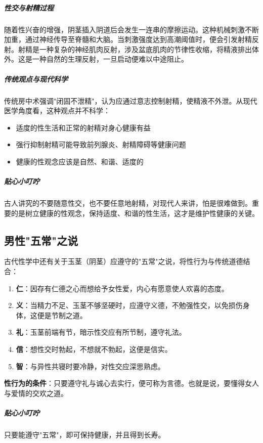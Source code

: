 \subparagraph{性交与射精过程}

随着性兴奋的增强，阴茎插入阴道后会发生一连串的摩擦运动。这种机械刺激不断加重，通过神经传导至脊髓和大脑。当刺激强度达到高潮阈值时，便会引发射精反射。射精是一种复杂的神经肌肉反射，涉及盆底肌肉的节律性收缩，将精液排出体外。这是一种自然的生理反射，一旦启动便难以中途阻止。

\subparagraph{传统观点与现代科学}

传统房中术强调"闭固不泄精"，认为应通过意志控制射精，使精液不外泄。从现代医学角度看，这种观点并不科学：
\begin{itemize}
    \item 适度的性生活和正常的射精对身心健康有益
    \item 强行抑制射精可能导致前列腺炎、射精障碍等健康问题
    \item 健康的性观念应该是自然、和谐、适度的
\end{itemize}

\subparagraph{贴心小叮咛}

古人讲究的不要随意性交，也不要任意地射精，对现代人来讲，怕是很难做到。重要的是树立健康的性观念，保持适度、和谐的性生活，这才是维护性健康的关键。

\subsection{男性"五常"之说}

古代性学中还有关于玉茎（阴茎）应遵守的"五常"之说，将性行为与传统道德结合：

\begin{enumerate}
    \item \textbf{仁}：因存有仁德之心而想给予女性爱，内心有愿意使人欢喜的态度。
    \item \textbf{义}：当精力不足、玉茎不够坚硬时，应遵守义德，不勉强性交，以免损伤身体，这便是节制之道。
    \item \textbf{礼}：玉茎前端有节，暗示性交应有所节制，遵守礼法。
    \item \textbf{信}：想性交时勃起，不想就不勃起，这便是信实。
    \item \textbf{智}：与异性共寝时要冷静，对性交应深思熟虑。
\end{enumerate}

\textbf{性行为的条件}：只要遵守礼与诚心去实行，便可称为言德。也就是说，要懂得女人与爱情的交欢之道。

\subparagraph{贴心小叮咛}

只要能遵守"五常"，即可保持健康，并且得到长寿。

